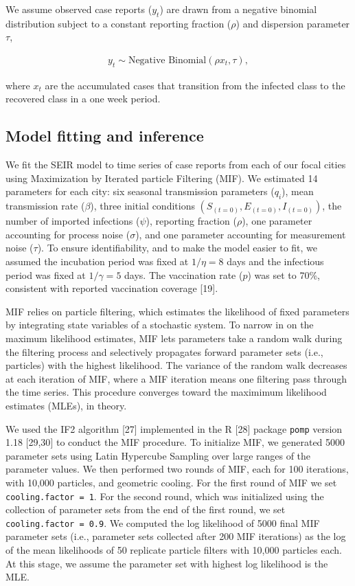 \documentclass[3p]{elsarticle} %
\begin{document}
We assume observed case reports (\(y_t\)) are drawn from a negative
binomial distribution subject to a constant reporting fraction
(\(\rho\)) and dispersion parameter \(\tau\),

\begin{align}
y_t \sim \text{Negative Binomial} \left( \rho x_t, \tau \right),
\end{align}

\noindent{}where \(x_t\) are the accumulated cases that transition from
the infected class to the recovered class in a one week period.

\hypertarget{model-fitting-and-inference}{%
\subsection{Model fitting and
inference}\label{model-fitting-and-inference}}

We fit the SEIR model to time series of case reports from each of our
focal cities using Maximization by Iterated particle Filtering (MIF). We
estimated 14 parameters for each city: six seasonal transmission
parameters (\(q_i\)), mean transmission rate (\(\beta\)), three initial
conditions \(\left(S_{(t=0)},E_{(t=0)},I_{(t=0)}\right)\), the number of
imported infections (\(\psi\)), reporting fraction (\(\rho\)), one
parameter accounting for process noise (\(\sigma\)), and one parameter
accounting for measurement noise (\(\tau\)). To ensure identifiability,
and to make the model easier to fit, we assumed the incubation period
was fixed at \(1/\eta = 8\) days and the infectious period was fixed at
\(1/\gamma = 5\) days. The vaccination rate (\(p\)) was set to 70\%,
consistent with reported vaccination coverage {[}19{]}.

MIF relies on particle filtering, which estimates the likelihood of
fixed parameters by integrating state variables of a stochastic system.
To narrow in on the maximum likelihood estimates, MIF lets parameters
take a random walk during the filtering process and selectively
propagates forward parameter sets (i.e., particles) with the highest
likelihood. The variance of the random walk decreases at each iteration
of MIF, where a MIF iteration means one filtering pass through the time
series. This procedure converges toward the maximimum likelihood
estimates (MLEs), in theory.

We used the IF2 algorithm {[}27{]} implemented in the R {[}28{]} package
\texttt{pomp} version 1.18 {[}29,30{]} to conduct the MIF procedure. To
initialize MIF, we generated 5000 parameter sets using Latin Hypercube
Sampling over large ranges of the parameter values. We then performed
two rounds of MIF, each for 100 iterations, with 10,000 particles, and
geometric cooling. For the first round of MIF we set
\texttt{cooling.factor\ =\ 1}. For the second round, which was
initialized using the collection of parameter sets from the end of the
first round, we set \texttt{cooling.factor\ =\ 0.9}. We computed the log
likelihood of 5000 final MIF parameter sets (i.e., parameter sets
collected after 200 MIF iterations) as the log of the mean likelihoods
of 50 replicate particle filters with 10,000 particles each. At this
stage, we assume the parameter set with highest log likelihood is the
MLE.
\end{document}
